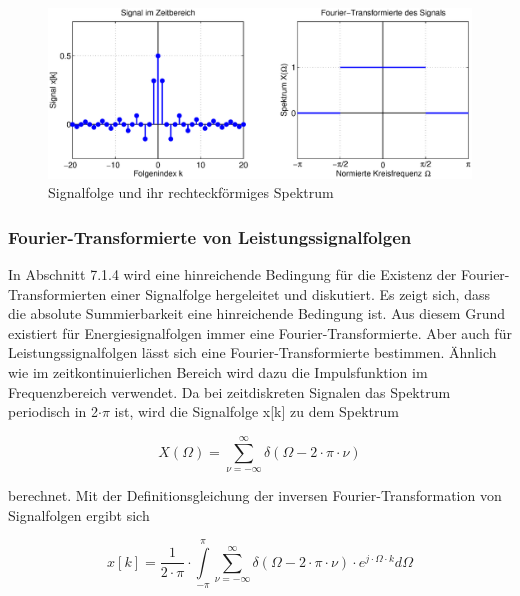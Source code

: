 \begin{figure}[H]
  \centerline{\includegraphics[width=1\textwidth]{Kapitel7/Bilder/image4.eps}}
  \caption{Signalfolge und ihr rechteckf\"{o}rmiges Spektrum}
  \label{fig:FourierRechteckSpektrum}
\end{figure}

\subsubsection{Fourier-Transformierte von Leistungssignalfolgen}

\noindent In Abschnitt 7.1.4 wird eine hinreichende Bedingung f\"{u}r die Existenz der Fourier-Transformierten einer Signalfolge hergeleitet und diskutiert. Es zeigt sich, dass die absolute Summierbarkeit eine hinreichende Bedingung ist. Aus diesem Grund existiert f\"{u}r Energiesignalfolgen immer eine Fourier-Transformierte. Aber auch f\"{u}r Leistungssignalfolgen l\"{a}sst sich eine Fourier-Transformierte bestimmen. \"{A}hnlich wie im zeitkontinuierlichen Bereich wird dazu die Impulsfunktion im Frequenzbereich verwendet. Da bei zeitdiskreten Signalen das Spektrum periodisch in 2$\cdot\pi$ ist, wird die Signalfolge x[k] zu dem Spektrum

\begin{equation}\label{eq:sevenfourtytwo}
X\left(\Omega \right)=\sum _{\nu =-\infty }^{\infty }\delta \left(\Omega -2\cdot \pi \cdot \nu \right)
\end{equation}

\noindent berechnet. Mit der Definitionsgleichung der inversen Fourier-Transformation von Signalfolgen ergibt sich

\begin{equation}\label{eq:sevenfourtythree}
x\left[k\right]=\frac{1}{2\cdot \pi} \cdot \int\limits _{-\pi }^{\pi }\sum _{\nu =-\infty }^{\infty }\delta \left(\Omega -2\cdot \pi \cdot \nu \right) \cdot e^{j\cdot \Omega \cdot k} d\Omega
\end{equation}

